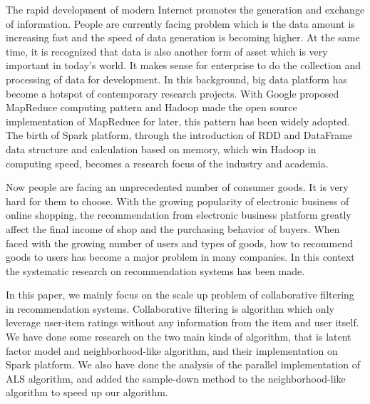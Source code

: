 %
%
\begin{enabstract}
The rapid development of modern Internet promotes the generation and exchange of information. People are currently facing problem which is the data amount is increasing fast and the speed of data generation is becoming higher.  At the same time, it is recognized that data is also another form of asset which is very important in today's world. It makes sense for enterprise to do the collection and processing of data for development. In this background, big data platform has become a hotspot of contemporary research projects. With Google proposed MapReduce computing pattern and Hadoop made the open source implementation of MapReduce for later, this pattern has been widely adopted. The birth of Spark platform, through the introduction of RDD and DataFrame data structure and calculation based on memory, which win Hadoop in computing speed, becomes a research focus of the industry and academia.
    
Now people are facing an unprecedented number of consumer goods. It is very hard for them to choose. With the growing popularity of electronic business of online shopping, the recommendation from electronic business platform greatly affect the final income of shop and the purchasing behavior of buyers. When faced with the growing number of users and types of goods, how to recommend goods to users has become a major problem in many companies. In this context the systematic research on recommendation systems has been made.

    In this paper, we mainly focus on the scale up problem of collaborative filtering in recommendation systems. Collaborative filtering is algorithm which only leverage user-item ratings without any information from the item and user itself. We have done some research on the two main kinds of algorithm, that is latent factor model and neighborhood-like algorithm, and their implementation on Spark platform. We also have done the analysis of the parallel implementation of ALS algorithm, and added the sample-down method to the neighborhood-like algorithm to speed up our algorithm.
\end{enabstract}
